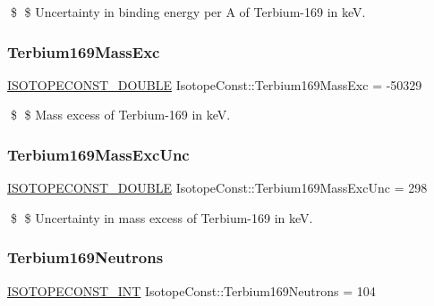 \$ \$ Uncertainty in binding energy per A of Terbium-\/169 in keV. \mbox{\label{group___isotope_const-_terbium-_tb169_ga88b51cea641234bc7d8f7fda65557bd5}} 
\subsubsection{\texorpdfstring{Terbium169\+Mass\+Exc}{Terbium169MassExc}}
{\footnotesize\ttfamily \mbox{\hyperlink{group___isotope_const-_macros_ga8f45a7272ce02c0b4c65c44636ed719a}{I\+S\+O\+T\+O\+P\+E\+C\+O\+N\+S\+T\+\_\+\+D\+O\+U\+B\+LE}} Isotope\+Const\+::\+Terbium169\+Mass\+Exc = -\/50329}

\$ \$ Mass excess of Terbium-\/169 in keV. \mbox{\label{group___isotope_const-_terbium-_tb169_gabbefdcd96aeb06074d9fca487e70594a}} 
\subsubsection{\texorpdfstring{Terbium169\+Mass\+Exc\+Unc}{Terbium169MassExcUnc}}
{\footnotesize\ttfamily \mbox{\hyperlink{group___isotope_const-_macros_ga8f45a7272ce02c0b4c65c44636ed719a}{I\+S\+O\+T\+O\+P\+E\+C\+O\+N\+S\+T\+\_\+\+D\+O\+U\+B\+LE}} Isotope\+Const\+::\+Terbium169\+Mass\+Exc\+Unc = 298}

\$ \$ Uncertainty in mass excess of Terbium-\/169 in keV. \mbox{\label{group___isotope_const-_terbium-_tb169_gab1dd9e00e06811010d57f38a98b6ad04}} 
\subsubsection{\texorpdfstring{Terbium169\+Neutrons}{Terbium169Neutrons}}
{\footnotesize\ttfamily \mbox{\hyperlink{group___isotope_const-_macros_ga5f18360b3e99483a35c32d789e62621c}{I\+S\+O\+T\+O\+P\+E\+C\+O\+N\+S\+T\+\_\+\+I\+NT}} Isotope\+Const\+::\+Terbium169\+Neutrons = 104}

